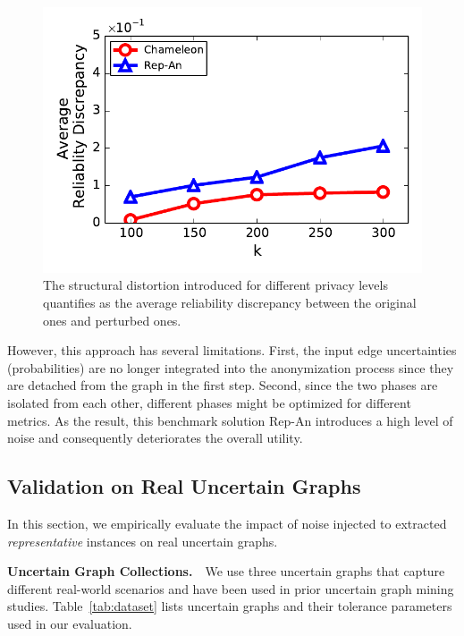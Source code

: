 \begin{figure}[!htb]
{\begin{minipage}[l]{0.62\columnwidth}
        \includegraphics[width=1\linewidth]{rep_exp/ppi_rel.pdf}
      \end{minipage}
      }

    \vspace{-10pt}
    \caption{The structural distortion introduced for different privacy levels quantifies as the average reliability discrepancy between the original ones and perturbed ones.}
    \label{fig:rep_exp}
    \vspace{-15pt}
\end{figure}

However, this approach has several limitations. First, the input edge uncertainties (probabilities) are no longer integrated into the anonymization process since they are detached from the graph in the first step. Second, since the two phases are isolated from each other, different phases might be optimized for different metrics. As the result, this benchmark solution Rep-An introduces a high level of noise and consequently deteriorates the overall utility.

\subsection{Validation on Real Uncertain Graphs}
In this section, we empirically evaluate the impact of noise injected to extracted \emph{representative} instances on real uncertain graphs. 

\textbf{Uncertain Graph Collections.}~~We use three uncertain graphs that capture different real-world scenarios and have been used in prior uncertain graph mining studies. Table~\ref{tab:dataset} lists uncertain graphs and their tolerance parameters used in our evaluation.

